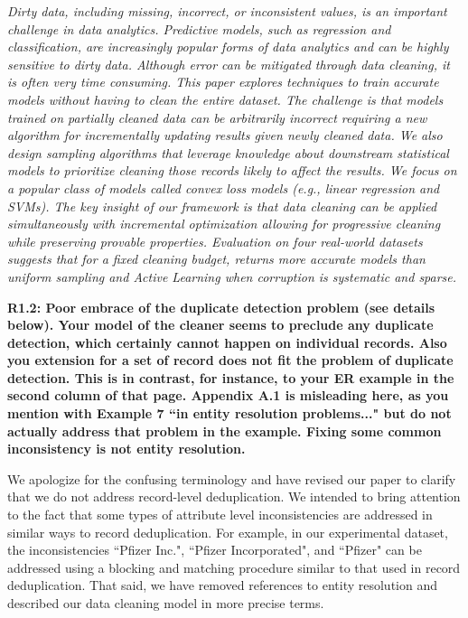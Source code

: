 \emph{Dirty data, including missing, incorrect, or inconsistent values, is an important challenge in data analytics.
Predictive models, such as regression and classification, are increasingly popular forms of data analytics and can be highly sensitive to dirty data.
Although error can be mitigated through data cleaning, it is often very time consuming.
This paper explores techniques to train accurate models without having to clean the entire dataset.
The challenge is that models trained on partially cleaned data can be arbitrarily incorrect requiring a new algorithm for incrementally updating results given newly cleaned data.
We also design sampling algorithms that leverage knowledge about downstream statistical models to prioritize cleaning those records likely to affect the results.
We focus on a popular class of models called convex loss models (e.g., linear regression and SVMs).
The key insight of our framework is that data cleaning can be applied simultaneously with incremental optimization allowing for progressive cleaning while preserving provable properties.
Evaluation on four real-world datasets suggests that for a fixed cleaning budget, \sys returns more accurate models than uniform sampling and Active Learning when corruption is systematic and sparse.}

\vspace{0.5em}

\noindent\textbf{R1.2: Poor embrace of the duplicate detection problem (see details below). Your model of the cleaner seems to preclude any duplicate detection, which certainly cannot happen on individual records. Also you extension for a set of record does not fit the problem of duplicate detection. This is in contrast, for instance, to your ER example in the second column of that page. Appendix A.1 is misleading here, as you mention with Example 7 ``in entity resolution problems..." but do not actually address that problem in the example. Fixing some common inconsistency is not entity resolution.}

We apologize for the confusing terminology and have revised our paper to clarify that we do not address record-level deduplication.
We intended to bring attention to the fact that some types of attribute level inconsistencies are addressed in similar ways to record deduplication.
For example, in our experimental dataset, the inconsistencies ``Pfizer Inc.", ``Pfizer Incorporated", and ``Pfizer" can be addressed using a blocking and matching procedure similar to that used in record deduplication.
That said, we have removed references to entity resolution and described our data cleaning model in more precise terms.

